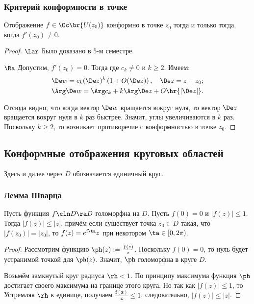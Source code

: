 \documentclass[a4paper]{article}
\begin{document}
\begin{theorem}
\subsubsection{Критерий конформности в точке}

\begin{theorem}
Отображение $f\in \Oc\br{U(z_0)}$ конформно в точке $z_0$ тогда и только тогда, когда $f'(z_0)\neq 0$.
\end{theorem}
\begin{proof}
$\Lar$ Было доказано в 5-м семестре.
\medskip

$\Ra$ Допустим, $f'(z_0) = 0$. Тогда
где $c_k \neq 0$ и  $k \ge 2$. Имеем:
\begin{gather*}
  \De w = c_k(\De z)^k\left(1+O(\De z)\right), \quad \De z = z-z_0;\\
  \Arg \De w=\Arg c_k+k\Arg\De z+O\hr{|\De z|}.
\end{gather*}

Отсюда видно,  что когда вектор $\De w$ вращается вокруг нуля,  то вектор $\De z$
вращается вокруг нуля в $k$ раз быстрее. Значит,  углы увеличиваются в $k$ раз. Поскольку
$k \ge 2$,  то возникает противоречие с конформностью в точке $z_0$.
\end{proof}

\subsection{Конформные отображения круговых областей}

Здесь и далее через $D$ обозначается единичный круг.

\subsubsection{Лемма Шварца}

\begin{lemma}[Шварца]
Пусть функция $f\cln D\ra D$ голоморфна на $D$. Пусть $f(0)=0$ и $|f(z)| \le 1$.
Тогда $|f(z)|\le |z|$, причём если существует точка $z_0\in D$ такая, что $|f(z_0)|=|z_0|$,
то $f(z)=e^{i\ta}z$ при некотором $\ta\in[0,2\pi)$.
\end{lemma}
\begin{proof}
Рассмотрим функцию $\ph(z) := \frac{f(z)}{z}$. Поскольку $f(0)=0$, то нуль будет устранимой точкой для $\ph(z)$.
Значит, $\ph$ голоморфна в круге $D$.

Возьмём замкнутый круг радиуса $\rh < 1$. По принципу максимума функция $\ph$ достигает своего максимума на
границе этого круга. Но так как $|f(z)| \le 1$, то
Устремляя $\rh$ к единице, получаем $\bm{\frac{f(z)}{z}} \le 1$, следовательно, $|f(z)|\le|z|$.


\end{proof}
\end{theorem}
\end{document}

